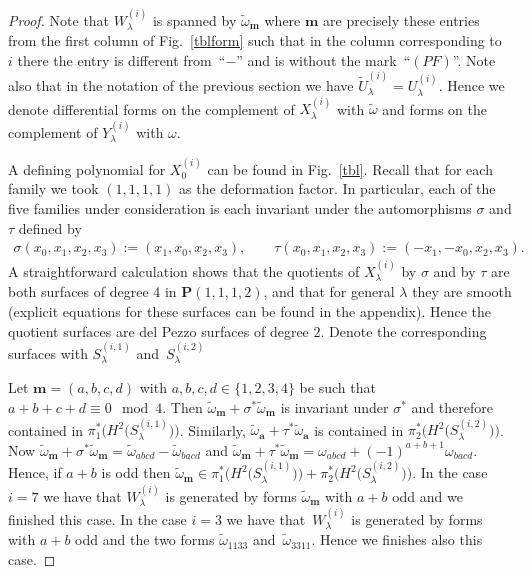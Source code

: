 \documentclass[pdftex]{sigma}
\numberwithin{equation}{section}
\begin{document}
\begin{proof} Note that $W_{\lambda}^{(i)}$ is spanned by $\tilde{\omega}_{\mathbf{m}}$ where $\mathbf{m}$ are precisely these entries from the f\/irst column of Fig.~\ref{tblform} such that in the column corresponding to~$i$ there the entry is dif\/ferent from~``$-$'' and is without the mark~``$(PF)$''. Note also that in the notation of the previous section we have $\tilde{U}^{(i)}_{\lambda}={U}^{(i)}_{\lambda}$. Hence we denote dif\/ferential forms on the complement of $X_\lambda^{(i)}$ with $\tilde{\omega}$ and forms on the complement of $Y_{\lambda}^{(i)}$ with $\omega$.

A def\/ining polynomial for $X^{(i)}_{0}$ can be found in Fig.~\ref{tbl}. Recall that for each family we took $(1,1,1,1)$ as the deformation factor. In particular, each of the f\/ive families under consideration is each invariant under the automorphisms $\sigma$ and $\tau$ def\/ined by \begin{gather*} \sigma(x_0,x_1,x_2,x_3):=(x_1,x_0,x_2,x_3),\qquad \tau(x_0,x_1,x_2,x_3):=(-x_1,-x_0,x_2,x_3).\end{gather*} A straightforward calculation shows that the quotients of $X_{\lambda}^{(i)}$ by $\sigma$ and by $\tau$ are both surfaces of degree 4 in $\mathbf{P}(1,1,1,2)$, and that for general $\lambda$ they are smooth (explicit equations for these surfaces can be found in the appendix). Hence the quotient surfaces are del Pezzo surfaces of degree $2$. Denote the corresponding surfaces with $S^{(i,1)}_{\lambda}$ and~$S^{(i,2)}_{\lambda}$

Let $\mathbf{m}=(a,b,c,d)$ with $a,b,c,d\in \{1,2,3,4\}$ be such that $a+b+c+d\equiv 0 \mod 4$. Then $\tilde{\omega}_\mathbf{m}+\sigma^*\tilde{\omega}_{\mathbf{m}}$ is invariant under $\sigma^*$ and therefore contained in $\pi_1^*\big(H^2\big(S^{(i,1)}_{\lambda}\big)\big)$. Similarly, $\tilde{\omega}_\mathbf{a}+\tau^*\tilde{\omega}_{\mathbf{a}}$ is contained in $\pi_2^*\big(H^2\big(S^{(i,2)}_{\lambda}\big)\big)$. Now $\tilde{\omega}_\mathbf{m}+\sigma^*\tilde{\omega}_{\mathbf{m}}=\tilde{\omega}_{abcd}-\tilde{\omega}_{bacd}$ and $\tilde{\omega}_\mathbf{m}+\tau^*\tilde{\omega}_{\mathbf{m}}=\omega_{abcd}+(-1)^{a+b+1}\omega_{bacd}$. Hence, if $a+b$ is odd then $\tilde{\omega}_{\mathbf{m}}\in \pi_1^*\big(H^2\big(S^{(i,1)}_{\lambda}\big)\big)+\pi_2^*\big(H^2\big(S^{(i,2)}_{\lambda}\big)\big)$. In the case $i=7$ we have that $W_{\lambda}^{(i)}$ is generated by forms $\tilde{\omega}_{\mathbf{m}}$ with $a+b$ odd and we f\/inished this case. In the case $i=3$ we have that~$W_{\lambda}^{(i)}$ is generated by forms with $a+b$ odd and the two forms $\tilde{\omega}_{1133}$ and~$\tilde{\omega}_{3311}$. Hence we f\/inishes also this case.


\end{proof}
\end{document}
